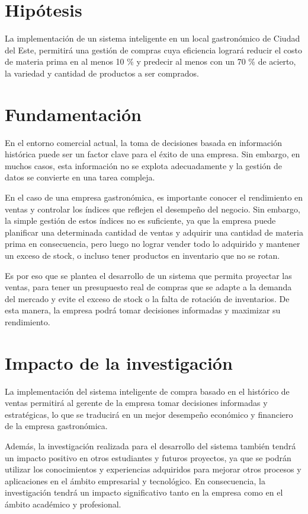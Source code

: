 \section{Hipótesis}

La implementación de un sistema inteligente en un local gastronómico de Ciudad del Este, permitirá una gestión de compras cuya eficiencia logrará reducir el costo de materia prima en al menos 10 \% y predecir al menos con un 70 \% de acierto, la variedad y cantidad de productos a ser comprados.

\section{Fundamentación}

En el entorno comercial actual, la toma de decisiones basada en información histórica puede ser un factor clave para el éxito de una empresa. Sin embargo, en muchos casos, esta información no se explota adecuadamente y la gestión de datos se convierte en una tarea compleja.

En el caso de una empresa gastronómica, es importante conocer el rendimiento en ventas y controlar los índices que reflejen el desempeño del negocio. Sin embargo, la simple gestión de estos índices no es suficiente, ya que la empresa puede planificar una determinada cantidad de ventas y adquirir una cantidad de materia prima en consecuencia, pero luego no lograr vender todo lo adquirido y mantener un exceso de stock, o incluso tener productos en inventario que no se rotan.

Es por eso que se plantea el desarrollo de un sistema que permita proyectar las ventas, para tener un presupuesto real de compras que se adapte a la demanda del mercado y evite el exceso de stock o la falta de rotación de inventarios. De esta manera, la empresa podrá tomar decisiones informadas y maximizar su rendimiento.



\section{Impacto de la investigación}

La implementación del sistema inteligente de compra basado en el histórico de ventas permitirá al gerente de la empresa tomar decisiones informadas y estratégicas, lo que se traducirá en un mejor desempeño económico y financiero de la empresa gastronómica.

Además, la investigación realizada para el desarrollo del sistema también tendrá un impacto positivo en otros estudiantes y futuros proyectos, ya que se podrán utilizar los conocimientos y experiencias adquiridos para mejorar otros procesos y aplicaciones en el ámbito empresarial y tecnológico. En consecuencia, la investigación tendrá un impacto significativo tanto en la empresa como en el ámbito académico y profesional.



